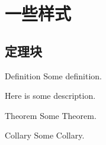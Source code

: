 \section{一些样式}


\subsection{定理块}

\begin{frame}
    \begin{defn}{Definition}{}
    Some definition.
    \end{defn}
    Here is some description.
    \begin{theo}{Theorem}{}
    Some Theorem.
    \end{theo}
    \begin{coro}{Collary}{}
        Some Collary.
    \end{coro}
    
\end{frame}


\begin{frame}
    
\end{frame}



